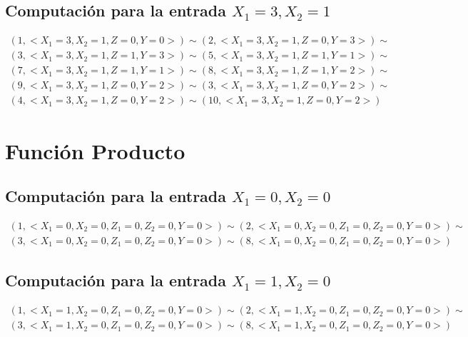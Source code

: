 \documentclass[a4paper]{article}
\begin{document}
		\subsection{Computación para la entrada $X_1=3, X_2=1$}
		\begin{equation*}\begin{gathered}
		(1, <X_1=3, X_2=1, Z=0, Y=0>) \sim (2, <X_1=3, X_2=1, Z=0, Y=3>) \sim\\
		(3, <X_1=3, X_2=1, Z=1, Y=3>) \sim (5, <X_1=3, X_2=1, Z=1, Y=1>) \sim\\
		(7, <X_1=3, X_2=1, Z=1, Y=1>) \sim (8, <X_1=3, X_2=1, Z=1, Y=2>) \sim\\
		(9, <X_1=3, X_2=1, Z=0, Y=2>) \sim (3, <X_1=3, X_2=1, Z=0, Y=2>) \sim\\
		(4, <X_1=3, X_2=1, Z=0, Y=2>) \sim (10, <X_1=3, X_2=1, Z=0, Y=2>)
		\end{gathered}\end{equation*}

		\section{Función Producto}
		\subsection{Computación para la entrada $X_1=0, X_2=0$}
		\begin{equation*}\begin{gathered}
		(1, <X_1=0, X_2=0, Z_1=0, Z_2=0, Y=0>) \sim (2, <X_1=0, X_2=0, Z_1=0, Z_2=0, Y=0>) \sim\\
		(3, <X_1=0, X_2=0, Z_1=0, Z_2=0, Y=0>) \sim	(8, <X_1=0, X_2=0, Z_1=0, Z_2=0, Y=0>)
		\end{gathered}\end{equation*}
		\subsection{Computación para la entrada $X_1=1, X_2=0$}
		\begin{equation*}\begin{gathered}
		(1, <X_1=1, X_2=0, Z_1=0, Z_2=0, Y=0>) \sim (2, <X_1=1, X_2=0, Z_1=0, Z_2=0, Y=0>) \sim\\
		(3, <X_1=1, X_2=0, Z_1=0, Z_2=0, Y=0>) \sim	(8, <X_1=1, X_2=0, Z_1=0, Z_2=0, Y=0>)
		\end{gathered}\end{equation*}
\end{document}
